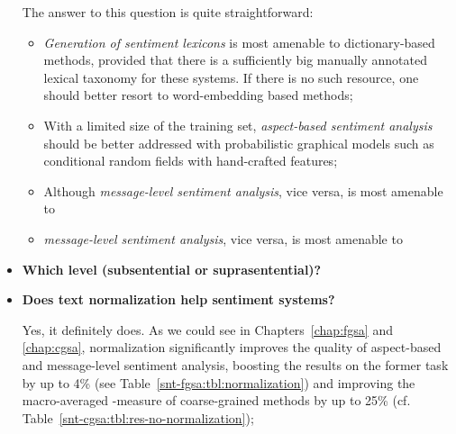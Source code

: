 \begin{itemize}
    The answer to this question is quite straightforward:
    \begin{itemize}
      \item\emph{Generation of sentiment lexicons} is most amenable to
        dictionary-based methods, provided that there is a
        sufficiently big manually annotated lexical taxonomy for these
        systems.  If there is no such resource, one should better
        resort to word-embedding based methods;
      \item With a limited size of the training set,
        \emph{aspect-based sentiment analysis} should be better
        addressed with probabilistic graphical models such as
        conditional random fields with hand-crafted features;
      \item Although \emph{message-level sentiment analysis}, vice
        versa, is most amenable to
      \item \emph{message-level sentiment analysis}, vice
        versa, is most amenable to
    \end{itemize}

  \item\textbf{Which level (subsentential or suprasentential)?}

  \item\textbf{Does text normalization help sentiment systems?}

    Yes, it definitely does.  As we could see in
    Chapters~\ref{chap:fgsa} and \ref{chap:cgsa}, normalization
    significantly improves the quality of aspect-based and
    message-level sentiment analysis, boosting the results on the
    former task by up to 4\% (see
    Table~\ref{snt-fgsa:tbl:normalization}) and improving the
    macro-averaged \F{}-measure of coarse-grained methods by up to
    25\% (cf. Table~\ref{snt-cgsa:tbl:res-no-normalization});



\end{itemize}
